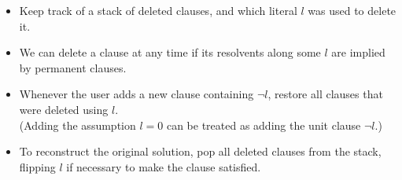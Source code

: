 \documentclass[a4paper, 11pt]{article}
\theoremstyle{definition}
\begin{document}
\begin{itemize}
  \item Keep track of a stack of deleted clauses, and which literal $l$ was used to delete it.
  \item We can delete a clause at any time if its resolvents along some $l$ are implied by permanent clauses.
  \item Whenever the user adds a new clause containing $\neg l$, restore all clauses that were deleted using $l$. \\
  (Adding the assumption $l=0$ can be treated as adding the unit clause $\neg l$.)
  \item To reconstruct the original solution, pop all deleted clauses from the stack, flipping $l$ if necessary to make the clause satisfied.
\end{itemize}



\end{document}
